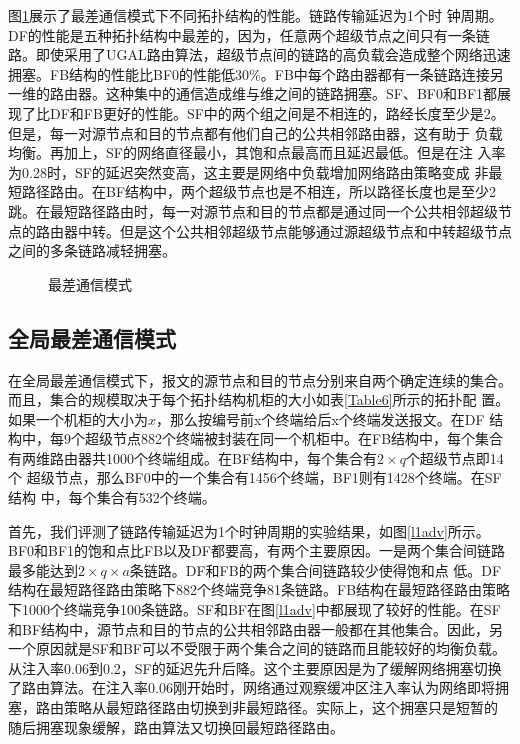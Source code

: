   图\ref{adv}展示了最差通信模式下不同拓扑结构的性能。链路传输延迟为1个时
  钟周期。DF的性能是五种拓扑结构中最差的，因为，任意两个超级节点之间只有一条链路。即使采用了UGAL路由算法，超级节点间的链路的高负载会造成整个网络迅速拥塞。FB结构的性能比BF0的性能低$30\%$。FB中每个路由器都有一条链路连接另一维的路由器。这种集中的通信造成维与维之间的链路拥塞。SF、BF0和BF1都展现了比DF和FB更好的性能。SF中的两个组之间是不相连的，路经长度至少是2。但是，每一对源节点和目的节点都有他们自己的公共相邻路由器，这有助于
  负载均衡。再加上，SF的网络直径最小，其饱和点最高而且延迟最低。但是在注
  入率为0.28时，SF的延迟突然变高，这主要是网络中负载增加网络路由策略变成
  非最短路径路由。在BF结构中，两个超级节点也是不相连，所以路径长度也是至少2跳。在最短路径路由时，每一对源节点和目的节点都是通过同一个公共相邻超级节点的路由器中转。但是这个公共相邻超级节点能够通过源超级节点和中转超级节点之间的多条链路减轻拥塞。

  \begin{figure}[t]
\setlength{\belowcaptionskip}{-.5cm}%
  \centering
 \begin{minipage}[t]{\textwidth}
   \centering
  \vspace{-.3cm}
\caption{最差通信模式}
  \label{adv}
   \end{minipage}
    \end{figure}

\subsection{全局最差通信模式}

在全局最差通信模式下，报文的源节点和目的节点分别来自两个确定连续的集合。
而且，集合的规模取决于每个拓扑结构机柜的大小如表\ref{Table6}所示的拓扑配
置。如果一个机柜的大小为$x$，那么按编号前x个终端给后x个终端发送报文。在DF 结构中，每9个超级节点882个终端被封装在同一个机柜中。在FB结构中，每个集合
有两维路由器共1000个终端组成。在BF结构中，每个集合有$2\times q$个超级节点即14 个
超级节点，那么BF0中的一个集合有1456个终端，BF1则有1428个终端。在SF结构
中，每个集合有532个终端。

首先，我们评测了链路传输延迟为1个时钟周期的实验结果，如图\ref{l1adv}所示。BF0和BF1的饱和点比FB以及DF都要高，有两个主要原因。一是两个集合间链路最多能达到$2\times q\times a$条链路。DF和FB的两个集合间链路较少使得饱和点
低。DF结构在最短路径路由策略下882个终端竞争81条链路。FB结构在最短路径路由策略下1000个终端竞争100条链路。SF和BF在图\ref{l1adv}中都展现了较好的性能。在SF和BF结构中，源节点和目的节点的公共相邻路由器一般都在其他集合。因此，另一个原因就是SF和BF可以不受限于两个集合之间的链路而且能较好的均衡负载。从注入率0.06到0.2，SF的延迟先升后降。这个主要原因是为了缓解网络拥塞切换了路由算法。在注入率0.06刚开始时，网络通过观察缓冲区注入率认为网络即将拥塞，路由策略从最短路径路由切换到非最短路径。实际上，这个拥塞只是短暂的
随后拥塞现象缓解，路由算法又切换回最短路径路由。

